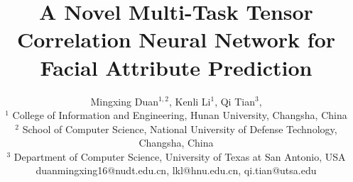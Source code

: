 \documentclass{sig-alternate-05-2015}
\begin{document}







%

\title{A Novel Multi-Task Tensor Correlation Neural Network for Facial Attribute Prediction }








\author{
Mingxing Duan$^{1, 2}$,
Kenli Li$^1$,
Qi Tian$^3$,
\\
$^1$ College of Information and Engineering, Hunan University, Changsha, China \\
$^2$ School of Computer Science, National University of Defense Technology, Changsha, China\\
$^3$ Department of Computer Science, University of Texas at San Antonio, USA  \\
duanmingxing16@nudt.edu.cn,
lkl@hnu.edu.cn,
qi.tian@utsa.edu
}
%
\end{document}
